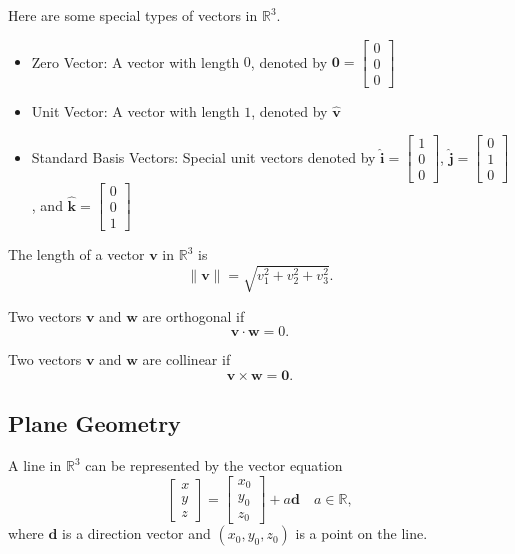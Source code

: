 \documentclass[11pt]{scrartcl}
\theoremstyle{plain}
\theoremstyle{definition}
\theoremstyle{remark}
\begin{document}
Here are some special types of vectors in $\mathbb{R}^{3}$.

\begin{itemize}
    \item Zero Vector: A vector with length $0$, denoted by $\mathbf{0}=\begin{bmatrix}0 \\ 0 \\ 0\end{bmatrix}$
    \item Unit Vector: A vector with length $1$, denoted by $\hat{\mathbf{v}}$
    \item Standard Basis Vectors: Special unit vectors denoted by $\hat{\mathbf{i}}=\begin{bmatrix}1 \\ 0 \\ 0
    \end{bmatrix}$, $\hat{\mathbf{j}}=\begin{bmatrix}0 \\ 1 \\ 0\end{bmatrix}$, and $\hat{\mathbf{k}}=\begin{bmatrix}
    0 \\ 0 \\ 1\end{bmatrix}$
\end{itemize}

The length of a vector $\mathbf{v}$ in $\mathbb{R}^{3}$ is 
\[ \lVert \mathbf{v} \rVert  =\sqrt{ v_{1}^{2}+v_{2}^{2}+v_{3}^{2} }. \]

Two vectors $\mathbf{v}$ and $\mathbf{w}$ are orthogonal if
\[ \mathbf{v}\cdot \mathbf{w}=0. \]

Two vectors $\mathbf{v}$ and $\mathbf{w}$ are collinear if
\[ \mathbf{v}\times \mathbf{w}=\mathbf{0}. \]

\subsection{Plane Geometry}

A line in $\mathbb{R}^{3}$ can be represented by the vector equation
\[ \begin{bmatrix}x \\ y \\z\end{bmatrix}=\begin{bmatrix}x_{0} \\ y_{0} \\z_{0}\end{bmatrix}+a\mathbf{d}\quad a\in 
\mathbb{R}, \]
where $\mathbf{d}$ is a direction vector and $(x_{0},y_{0},z_{0})$ is a point on the line. \\[-0.5em]
\end{document}
